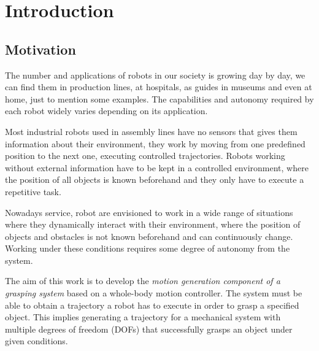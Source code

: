 

\chapter{\textbf{Introduction}}

%

\section{Motivation}
The number and applications of robots in our society is growing day by day, we can find them in production lines, at hospitals, as guides in museums and even at home, just to mention some examples. The capabilities and autonomy required by each robot widely varies depending on its application. 

Most industrial robots used in assembly lines have no sensors that gives them information about their environment, they work by moving from one predefined position to the next one, executing controlled trajectories. Robots working without external information have to be kept in a controlled environment, where the position of all objects is known beforehand and they only have to execute a repetitive task.

Nowadays service, robot are envisioned to work in a wide range of situations where they dynamically interact with their environment, where the position of objects and obstacles is not known beforehand and can continuously change. Working under these conditions requires some degree of autonomy from the system.

The aim of this work is to develop the \textit{motion generation component of a  grasping system} based on a whole-body motion controller. The system must be able to obtain a trajectory a robot has to execute in order to grasp a specified object. This implies generating a trajectory for a mechanical system with multiple degrees of freedom (DOFs) that successfully grasps an object under given conditions.

